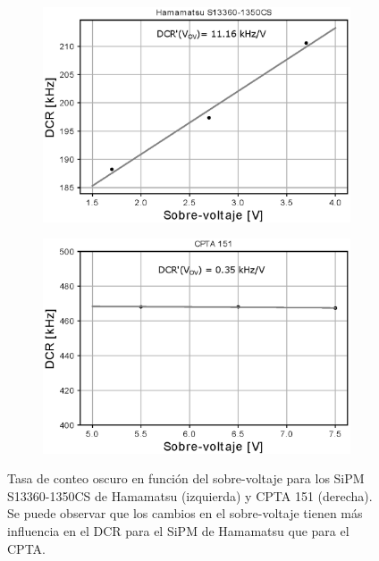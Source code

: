 \begin{figure}[h!]
     \centering
     \begin{subfigure}[b]{0.49\textwidth}
         \centering
         \includegraphics[width=1.1\textwidth]{Images/DCR_vs_ov_1350CS.eps}
         \caption{}
         \label{fig:DCR_ov_1350CS}
     \end{subfigure}
     \begin{subfigure}[b]{0.49\textwidth}
         \centering
         \includegraphics[width=1.1\textwidth]{Images/DCR_vs_ov_CPTA.eps}
         \caption{}
         \label{fig:DCR_ov_CPTA}
     \end{subfigure}
        \caption{Tasa de conteo oscuro en función del sobre-voltaje para los SiPM S13360-1350CS de Hamamatsu (izquierda) y CPTA 151 (derecha). Se puede observar que los cambios en el sobre-voltaje tienen más influencia en el DCR para el SiPM de Hamamatsu que para el CPTA.}
        \label{fig:DCR_vs_ov}
\end{figure}
